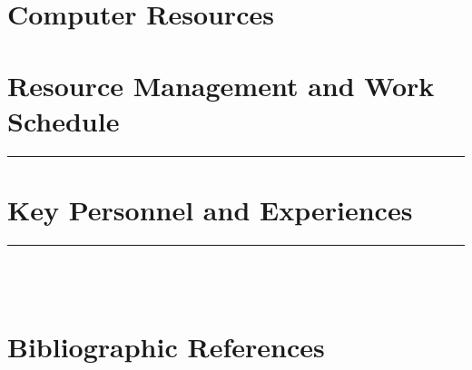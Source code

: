 \documentclass [a4paper, 11pt]{article}
\begin{document}
\section{Computer Resources}






\section{Resource Management and Work Schedule}
\rule{\textwidth}{0.4pt}



\section{Key Personnel and Experiences}
\rule{\textwidth}{0.4pt}\\
\\

\section{Bibliographic References}

\footnotesize{
	
}
\end{document}
